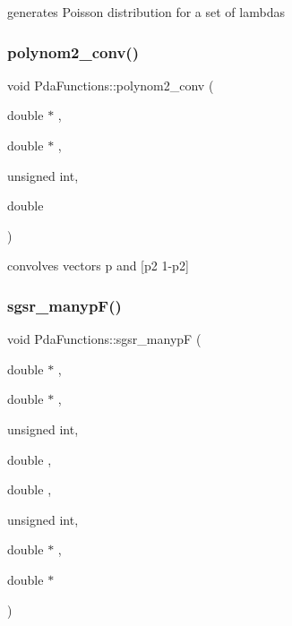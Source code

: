 generates Poisson distribution for a set of lambdas \mbox{\label{namespace_pda_functions_a91097b4e0e8dc8a283430fc3ad3c9acf}} 
\subsubsection{\texorpdfstring{polynom2\+\_\+conv()}{polynom2\_conv()}}
{\footnotesize\ttfamily void Pda\+Functions\+::polynom2\+\_\+conv (\begin{DoxyParamCaption}\item[{double $\ast$}]{,  }\item[{double $\ast$}]{,  }\item[{unsigned}]{int,  }\item[{double}]{ }\end{DoxyParamCaption})}

convolves vectors p and \mbox{[}p2 1-\/p2\mbox{]} \mbox{\label{namespace_pda_functions_afc3779dee6ad3e7d4a6f3c929ac0e160}} 
\subsubsection{\texorpdfstring{sgsr\+\_\+manyp\+F()}{sgsr\_manypF()}}
{\footnotesize\ttfamily void Pda\+Functions\+::sgsr\+\_\+manypF (\begin{DoxyParamCaption}\item[{double $\ast$}]{,  }\item[{double $\ast$}]{,  }\item[{unsigned}]{int,  }\item[{double}]{,  }\item[{double}]{,  }\item[{unsigned}]{int,  }\item[{double $\ast$}]{,  }\item[{double $\ast$}]{ }\end{DoxyParamCaption})}

\mbox{\label{namespace_pda_functions_aa77615bc27d7b196fdbe50429ceadb86}} 
